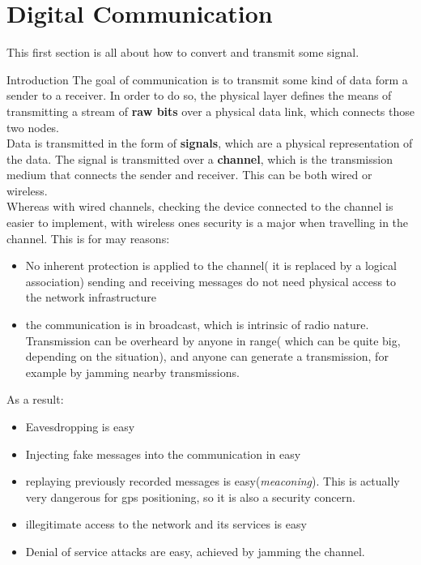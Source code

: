 \chapter{Digital Communication}
This first section is all about how to convert and transmit some signal.\
\begin{section}{Introduction}
The goal of communication is to transmit some kind of data form a sender to a receiver. In order 
to do so, the physical layer defines the means of transmitting a stream of \textbf{raw bits} over a
physical data link, which connects those two nodes.\\
Data is transmitted in the form of \textbf{signals}, which are a physical representation of the data.
The signal is transmitted over a \textbf{channel}, which is the transmission medium that connects 
the sender and receiver. This can be both wired or wireless.\\
Whereas with wired channels, checking the device connected to the channel is easier to implement, 
with wireless ones security is a major when travelling in the channel. This is for may reasons:
\begin{itemize}
  \item No inherent protection is applied to the channel( it is replaced by a logical association)
     \subitem sending and receiving messages do not need physical access to the network 
     infrastructure
  \item the communication is in broadcast, which is intrinsic of radio nature.
    \subitem Transmission can be overheard by anyone in range( which can be quite big, depending 
    on the situation), and anyone can generate a transmission, for example by jamming nearby 
    transmissions.
\end{itemize}
As a result:
\begin{itemize}
  \item Eavesdropping is easy
  \item Injecting fake messages into the communication in easy
  \item replaying previously recorded messages is easy(\textit{meaconing}). This is actually very 
    dangerous for gps positioning, so it is also a security concern.
  \item illegitimate access to the network and its services is easy
  \item Denial of service attacks are easy, achieved by jamming the channel.
\end{itemize}
\end{section}
